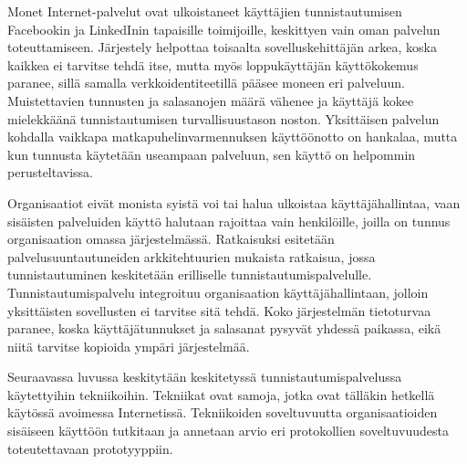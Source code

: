 Monet Internet-palvelut ovat ulkoistaneet käyttäjien tunnistautumisen Facebookin ja LinkedInin tapaisille toimijoille, keskittyen vain oman palvelun toteuttamiseen. Järjestely helpottaa toisaalta sovelluskehittäjän arkea, koska kaikkea ei tarvitse tehdä itse, mutta myös loppukäyttäjän käyttökokemus paranee, sillä samalla verkkoidentiteetillä pääsee moneen eri palveluun. Muistettavien tunnusten ja salasanojen määrä vähenee ja käyttäjä kokee mielekkäänä tunnistautumisen turvallisuustason noston. Yksittäisen palvelun kohdalla vaikkapa matkapuhelinvarmennuksen käyttöönotto on hankalaa, mutta kun tunnusta käytetään useampaan palveluun, sen käyttö on helpommin perusteltavissa.

Organisaatiot eivät monista syistä voi tai halua ulkoistaa käyttäjähallintaa, vaan sisäisten palveluiden käyttö halutaan rajoittaa vain henkilöille, joilla on tunnus organisaation omassa järjestelmässä. Ratkaisuksi esitetään palvelusuuntautuneiden arkkitehtuurien mukaista ratkaisua, jossa tunnistautuminen keskitetään erilliselle tunnistautumispalvelulle. Tunnistautumispalvelu integroituu organisaation käyttäjähallintaan, jolloin yksittäisten sovellusten ei tarvitse sitä tehdä. Koko järjestelmän tietoturvaa paranee, koska käyttäjätunnukset ja salasanat pysyvät yhdessä paikassa, eikä niitä tarvitse kopioida ympäri järjestelmää.

Seuraavassa luvussa keskitytään keskitetyssä tunnistautumispalvelussa käytettyihin tekniikoihin. Tekniikat ovat samoja, jotka ovat tälläkin hetkellä käytössä avoimessa Internetissä. Tekniikoiden soveltuvuutta organisaatioiden sisäiseen käyttöön tutkitaan ja annetaan arvio eri protokollien soveltuvuudesta toteutettavaan prototyyppiin.